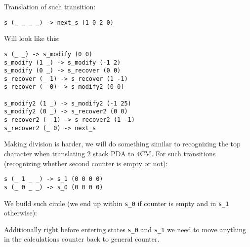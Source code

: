 \documentclass[english,shortabstract,mgr]{iithesis}
\begin{document}
Translation of such transition:
\begin{verbatim}
s (_ _ _ _) -> next_s (1 0 2 0)
\end{verbatim}

Will look like this:
\begin{verbatim}
s (_ _) -> s_modify (0 0)
s_modify (1 _) -> s_modify (-1 2)
s_modify (0 _) -> s_recover (0 0)
s_recover (_ 1) -> s_recover (1 -1)
s_recover (_ 0) -> s_modify2 (0 0)

s_modify2 (1 _) -> s_modify2 (-1 25)
s_modify2 (0 _) -> s_recover2 (0 0)
s_recover2 (_ 1) -> s_recover2 (1 -1)
s_recover2 (_ 0) -> next_s
\end{verbatim}


Making division is harder, we will do something similar to recognizing the top
character when translating $2$ stack PDA to $4$CM. For such transitions (recognizing
whether second counter is empty or not):
\begin{verbatim}
s (_ 1 _ _) -> s_1 (0 0 0 0)
s (_ 0 _ _) -> s_0 (0 0 0 0)
\end{verbatim}

We build such circle (we end up within \texttt{s\_0} if counter is empty and in \texttt{s\_1} otherwise):

\begin{center}
\end{center}

Additionally right before entering states \texttt{s\_0} and \texttt{s\_1}
we need to move anything in the calculations counter back to general counter.
\end{document}
